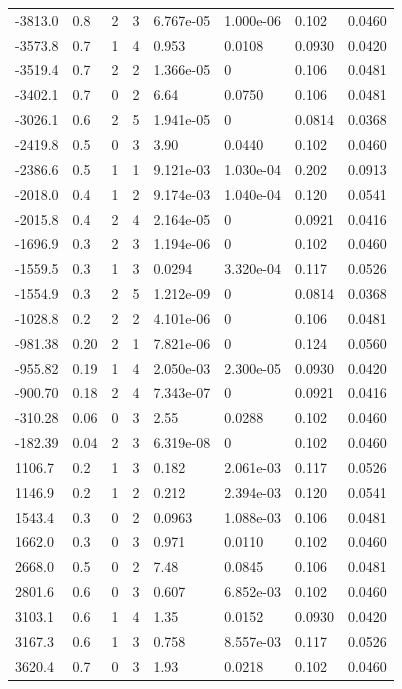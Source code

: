 \documentclass[preview]{standalone}
\begin{document}
{{\begin{tabular}{L{1.2cm}C{1.2cm} C{0.3cm}C{0.5cm} C{1.4cm}C{1.4cm} C{1.4cm}C{1.4cm}}
  -3813.0  &   0.8  & 2     &  3 &  6.767e-05  & 1.000e-06  & 0.102 &  0.0460   \\ 
  -3573.8  &   0.7  & 1     &  4 &  0.953  & 0.0108  & 0.0930 &  0.0420   \\ 
  -3519.4  &   0.7  & 2     &  2 &  1.366e-05  & 0  & 0.106 &  0.0481   \\ 
  -3402.1  &   0.7  & 0     &  2 &  6.64  & 0.0750  & 0.106 &  0.0481   \\ 
  -3026.1  &   0.6  & 2     &  5 &  1.941e-05  & 0  & 0.0814 &  0.0368   \\ 
  -2419.8  &   0.5  & 0     &  3 &  3.90  & 0.0440  & 0.102 &  0.0460   \\ 
  -2386.6  &   0.5  & 1     &  1 &  9.121e-03  & 1.030e-04  & 0.202 &  0.0913   \\ 
  -2018.0  &   0.4  & 1     &  2 &  9.174e-03  & 1.040e-04  & 0.120 &  0.0541   \\ 
  -2015.8  &   0.4  & 2     &  4 &  2.164e-05  & 0  & 0.0921 &  0.0416   \\ 
  -1696.9  &   0.3  & 2     &  3 &  1.194e-06  & 0  & 0.102 &  0.0460   \\ 
  -1559.5  &   0.3  & 1     &  3 &  0.0294  & 3.320e-04  & 0.117 &  0.0526   \\ 
  -1554.9  &   0.3  & 2     &  5 &  1.212e-09  & 0  & 0.0814 &  0.0368   \\ 
  -1028.8  &   0.2  & 2     &  2 &  4.101e-06  & 0  & 0.106 &  0.0481   \\ 
  -981.38  &  0.20  & 2     &  1 &  7.821e-06  & 0  & 0.124 &  0.0560   \\ 
  -955.82  &  0.19  & 1     &  4 &  2.050e-03  & 2.300e-05  & 0.0930 &  0.0420   \\ 
  -900.70  &  0.18  & 2     &  4 &  7.343e-07  & 0  & 0.0921 &  0.0416   \\ 
  -310.28  &  0.06  & 0     &  3 &  2.55  & 0.0288  & 0.102 &  0.0460   \\ 
  -182.39  &  0.04  & 2     &  3 &  6.319e-08  & 0  & 0.102 &  0.0460   \\ 
  1106.7  &   0.2  & 1     &  3 &  0.182  & 2.061e-03  & 0.117 &  0.0526   \\ 
  1146.9  &   0.2  & 1     &  2 &  0.212  & 2.394e-03  & 0.120 &  0.0541   \\ 
  1543.4  &   0.3  & 0     &  2 &  0.0963  & 1.088e-03  & 0.106 &  0.0481   \\ 
  1662.0  &   0.3  & 0     &  3 &  0.971  & 0.0110  & 0.102 &  0.0460   \\ 
  2668.0  &   0.5  & 0     &  2 &  7.48  & 0.0845  & 0.106 &  0.0481   \\ 
  2801.6  &   0.6  & 0     &  3 &  0.607  & 6.852e-03  & 0.102 &  0.0460   \\ 
  3103.1  &   0.6  & 1     &  4 &  1.35  & 0.0152  & 0.0930 &  0.0420   \\ 
  3167.3  &   0.6  & 1     &  3 &  0.758  & 8.557e-03  & 0.117 &  0.0526   \\ 
  3620.4  &   0.7  & 0     &  3 &  1.93  & 0.0218  & 0.102 &  0.0460   \\ 
\hline 
\end{tabular} 

}}
\end{document}
